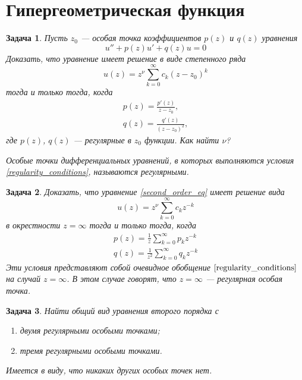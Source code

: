\documentclass{article}
\newtheorem{problem}{Задача}
\begin{document}
\section{Гипергеометрическая функция}
\begin{problem}
    Пусть $z_0$ --- особая точка коэффициентов $p(z)$ и $q(z)$ уравнения
    \begin{equation}
        \label{second_order_eq}
        u'' + p(z)u' + q(z)u = 0
    \end{equation}
    Доказать, что уравнение имеет решение в виде степенного ряда 
    \begin{equation}
        u(z) = z^{\nu}\sum_{k=0}^{\infty} c_k (z - z_0)^k 
    \end{equation}
    тогда и только тогда, когда 
    \begin{equation}
        \label{regularity_conditions}
        \begin{gathered}
            p(z) = \frac{p'(z)}{z - z_0},\\
            q(z) = \frac{q'(z)}{(z - z_0)^2},
        \end{gathered}
    \end{equation}
    где $p(z)$, $q(z)$ --- регулярные в $z_0$ функции. Как найти $\nu$?

    Особые точки дифференциальных уравнений, в которых выполняются условия 
    \eqref{regularity_conditions}, называются
    \emph{регулярными}.
\end{problem}   
\begin{problem}
    Доказать, что уравнение \eqref{second_order_eq} имеет решение вида
    \begin{equation}
        u(z) = z^{\nu}\sum_{k=0}^{\infty} c_k z^{-k}
    \end{equation}
    в окрестности $z = \infty$ тогда и только тогда, когда
    \begin{equation}
        \label{regularity_conditions_on_inf}
        \begin{gathered}
            p(z) = \frac{1}{z}\sum_{k=0}^{\infty} p_k z^{-k}\\
            q(z) = \frac{1}{z^2}\sum_{k=0}^{\infty} q_k z^{-k}
        \end{gathered}
    \end{equation}
    Эти условия представляют собой очевидное обобщение $\eqref{regularity_conditions}$ на
    случай $z = \infty$. В этом случае говорят, что $z = \infty$ --- регулярная особая точка.
\end{problem}
\begin{problem}
    Найти общий вид уравнения второго порядка с
    \begin{enumerate}
        \item двумя регулярными особыми точками;
        \item тремя регулярными особыми точками.
    \end{enumerate}
    Имеется в виду, что никаких других особых точек нет.
\end{problem}
\end{document}
